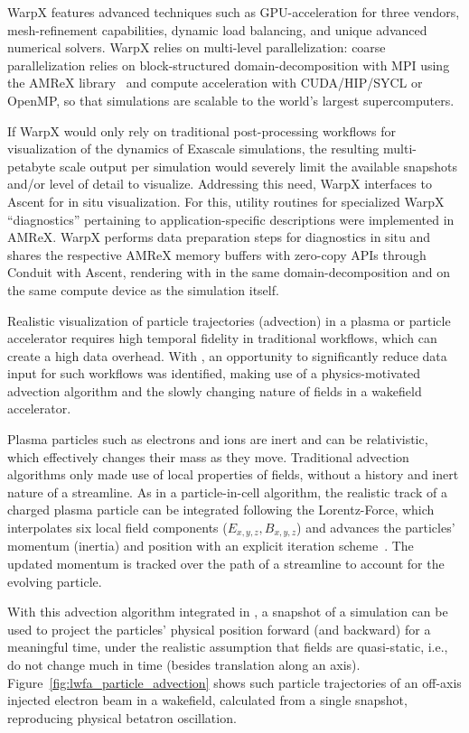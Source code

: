 WarpX features advanced techniques such as GPU-acceleration for three vendors, mesh-refinement capabilities, dynamic load balancing, and unique advanced numerical solvers.
WarpX relies on multi-level parallelization: coarse parallelization relies on block-structured domain-decomposition with MPI using the AMReX library~\cite{Zhang2019} and compute acceleration with CUDA/HIP/SYCL or OpenMP, so that simulations are scalable to the world's largest supercomputers.

If WarpX would only rely on traditional post-processing workflows for visualization of the dynamics of Exascale simulations, the resulting multi-petabyte scale output per simulation would severely limit the available snapshots and/or level of detail to visualize.
Addressing this need, WarpX interfaces to Ascent for in situ visualization.
For this, utility routines for specialized WarpX ``diagnostics'' pertaining to application-specific descriptions were implemented in AMReX.
WarpX performs data preparation steps for diagnostics in situ and shares the respective AMReX memory buffers with zero-copy APIs through Conduit with Ascent, rendering with \vtkm in the same domain-decomposition and on the same compute device as the simulation itself.

Realistic visualization of particle trajectories (advection) in a plasma or particle accelerator requires high temporal fidelity in traditional workflows, which can create a high data overhead.
With \vtkm, an opportunity to significantly reduce data input for such workflows was identified, making use of a physics-motivated advection algorithm and the slowly changing nature of fields in a wakefield accelerator.

Plasma particles such as electrons and ions are inert and can be relativistic, which effectively changes their mass as they move.
Traditional advection algorithms only made use of local properties of fields, without a history and inert nature of a streamline.
As in a particle-in-cell algorithm, the realistic track of a charged plasma particle can be integrated following the Lorentz-Force, which interpolates six local field components ($E_{x,y,z}, B_{x,y,z}$) and advances the particles' momentum (inertia) and position with an explicit iteration scheme~\cite{Boris1970}.
The updated momentum is tracked over the path of a streamline to account for the evolving particle.

With this advection algorithm integrated in \vtkm, a snapshot of a simulation can be used to project the particles' physical position forward (and backward) for a meaningful time, under the realistic assumption that fields are quasi-static, i.e., do not change much in time (besides translation along an axis).
Figure~\ref{fig:lwfa_particle_advection} shows such particle trajectories of an off-axis injected electron beam in a wakefield, calculated from a single snapshot, reproducing physical betatron oscillation.

